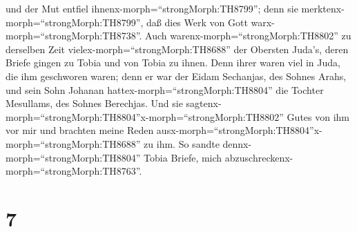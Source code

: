 und der Mut entfiel ihnenx-morph=``strongMorph:TH8799''; denn sie
merktenx-morph=``strongMorph:TH8799'', daß dies Werk von Gott
warx-morph=``strongMorph:TH8738''.  Auch
warenx-morph=``strongMorph:TH8802'' zu derselben Zeit
vielex-morph=``strongMorph:TH8688'' der Obersten Juda's, deren Briefe
gingen zu Tobia und von Tobia zu ihnen.  Denn ihrer waren
viel in Juda, die ihm geschworen waren; denn er war der Eidam Sechanjas,
des Sohnes Arahs, und sein Sohn Johanan
hattex-morph=``strongMorph:TH8804'' die Tochter Mesullams, des Sohnes
Berechjas.  Und sie
sagtenx-morph=``strongMorph:TH8804''x-morph=``strongMorph:TH8802'' Gutes
von ihm vor mir und brachten meine Reden
ausx-morph=``strongMorph:TH8804''x-morph=``strongMorph:TH8688'' zu ihm.
So sandte dennx-morph=``strongMorph:TH8804'' Tobia Briefe, mich
abzuschreckenx-morph=``strongMorph:TH8763''.

\hypertarget{section-6}{%
\section{7}\label{section-6}}

